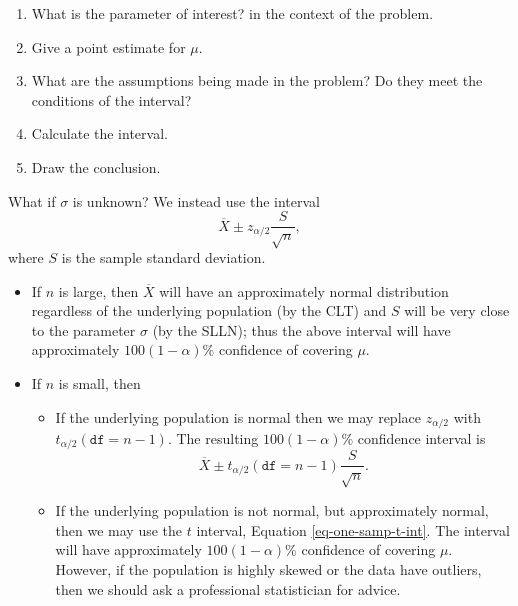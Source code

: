 \begin{enumerate}
\item What is the parameter of interest? in the context of the problem.
\item Give a point estimate for \(\mu\).
\item What are the assumptions being made in the problem? Do they meet
the conditions of the interval?
\item Calculate the interval.
\item Draw the conclusion.
\end{enumerate}

\begin{rem}
What if \(\sigma\) is unknown? We instead use the interval
\begin{equation}
\overline{X}\pm z_{\alpha/2}\frac{S}{\sqrt{n}},
\end{equation}
where \(S\) is the sample standard deviation.
\begin{itemize}
\item If \(n\) is large, then \(\overline{X}\) will have an approximately
normal distribution regardless of the underlying population (by the
CLT) and \(S\) will be very close to the parameter \(\sigma\) (by
the SLLN); thus the above interval will have approximately
\(100(1-\alpha)\%\) confidence of covering \(\mu\).
\item If \(n\) is small, then
\begin{itemize}
\item If the underlying population is normal then we may replace
\(z_{\alpha/2}\) with \(t_{\alpha/2}(\mathtt{df}=n-1)\). The
resulting \(100(1-\alpha)\%\) confidence interval is
\begin{equation}
\label{eq-one-samp-t-int}
\overline{X}\pm t_{\alpha/2}(\mathtt{df}=n-1)\frac{S}{\sqrt{n}}.
\end{equation}
\item If the underlying population is not normal, but approximately
normal, then we may use the \(t\) interval, Equation
\eqref{eq-one-samp-t-int}. The interval will have approximately
\(100(1-\alpha)\%\) confidence of covering \(\mu\). However, if
the population is highly skewed or the data have outliers, then
we should ask a professional statistician for advice.
\end{itemize}
\end{itemize}
\end{rem}

